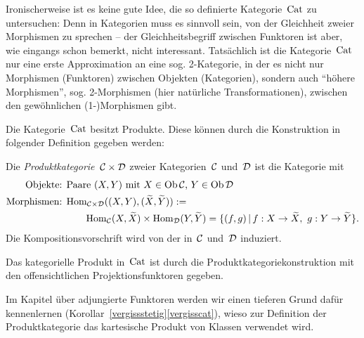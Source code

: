 \begin{bem}Ironischerweise ist es keine gute Idee, die so definierte
Kategorie~$\mathrm{Cat}$ zu untersuchen: Denn in Kategorien muss es sinnvoll sein, von
der Gleichheit zweier Morphismen zu sprechen -- der Gleichheitsbegriff zwischen
Funktoren ist aber, wie eingangs schon bemerkt, nicht interessant. Tatsächlich ist
die Kategorie~$\mathrm{Cat}$ nur eine erste Approximation an eine sog. 2-Kategorie, in
der es nicht nur Morphismen (Funktoren) zwischen Objekten (Kategorien), sondern
auch "`höhere Morphismen"', sog. 2-Morphismen (hier natürliche
Transformationen), zwischen den gewöhnlichen (1-)Morphismen gibt.
\end{bem}

Die Kategorie~$\mathrm{Cat}$ besitzt Produkte. Diese können durch die Konstruktion in
folgender Definition gegeben werden:
\begin{defn}\label{productcat}
Die \emph{Produktkategorie~$\mathcal{C} \times \mathcal{D}$} zweier Kategorien~$\mathcal{C}$ und~$\mathcal{D}$ ist
die Kategorie mit
\begin{align*}
  \text{Objekte: } & \text{Paare $(X,Y)$ mit~$X \in \operatorname{Ob}\mathcal{C}$, $Y \in \operatorname{Ob}\mathcal{D}$} \\
  \text{Morphismen: } &
    \mathrm{Hom}_{\mathcal{C} \times \mathcal{D}}((X,Y), (\widetilde X, \widetilde Y)) := \\
  & \qquad
      \mathrm{Hom}_{\mathcal{C}}(X,\widetilde X) \times \mathrm{Hom}_{\mathcal{D}}(Y,\widetilde Y) =
      \{ (f, g) \,|\, f : X \to \widetilde X,\ g : Y \to \widetilde Y \}.
\end{align*}
Die Kompositionsvorschrift wird von der in~$\mathcal{C}$ und~$\mathcal{D}$ induziert.
\end{defn}
\begin{prop}Das kategorielle Produkt in~$\mathrm{Cat}$ ist durch die
Produktkategoriekonstruktion mit den offensichtlichen Projektionsfunktoren
gegeben.\end{prop}
Im Kapitel über adjungierte Funktoren werden wir einen tieferen Grund dafür
kennenlernen (Korollar~\ref{vergissstetig}\ref{vergisscat}), wieso zur
Definition der Produktkategorie das kartesische Produkt von Klassen verwendet
wird.



